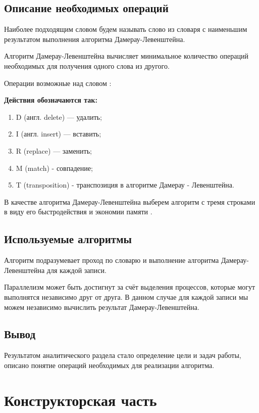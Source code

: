 \documentclass[12pt,a4paper]{report}
\begin{document}
\section{Описание необходимых операций}

Наиболее подходящим словом будем называть слово из словаря с наименьшим результатом выполнения алгоритма Дамерау-Левенштейна.

Алгоритм Дамерау-Левенштейна вычисляет минимальное количество операций необходимых для получения одного слова из другого.

Операции возможные над словом :


\textbf{Действия обозначаются так:} 
\begin{enumerate}
  	\item D (англ. delete) — удалить;
	\item I (англ. insert) — вставить;
	\item R (replace) — заменить;
	\item M (match) - совпадение;
	\item T (transposition) - транспозиция в алгоритме Дамерау - Левенштейна.
	\label{formula:1}
\end{enumerate}
    
В качестве алгоритма Дамерау-Левенштейна выберем алгоритм с тремя строками в виду его быстродействия и экономии памяти \cite{ll}.

\section{Используемые алгоритмы}

Алгоритм подразумевает проход по словарю и выполнение алгоритма Дамерау-Левенштейна для каждой записи.

Параллелизм может быть достигнут за счёт выделения процессов, которые могут выполнятся независимо друг от 
друга.
В данном случае для каждой записи мы можем независимо вычислить результат Дамерау-Левенштейна.

\section{Вывод}

Результатом аналитического раздела стало определение цели и задач работы, описано понятие операций необходимых для реализации алгоритма.

\newpage
\chapter{Конструкторская часть}
\end{document}

